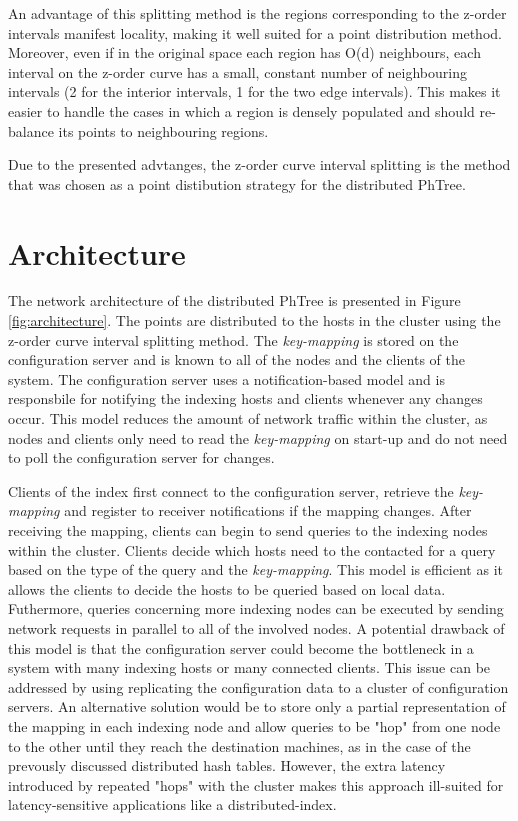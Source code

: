 \documentclass[11pt,a4paper]{globis-book}
\begin{document}
An advantage of this splitting method is the regions corresponding to the z-order intervals manifest locality, making it well suited for a point distribution method. Moreover, even if in the original space each region has O(d) neighbours, each interval on the z-order curve has a small, constant number of neighbouring intervals (2 for the interior intervals, 1 for the two edge intervals). This makes it easier to handle the cases in which a region is densely populated and should re-balance its points to neighbouring regions. 

Due to the presented advtanges, the z-order curve interval splitting is the method that was chosen as a point distibution strategy for the distributed PhTree. 
\section{Architecture}
\label{sec:distindex-architectures}

The network architecture of the distributed PhTree is presented in Figure \ref{fig:architecture}. The points are distributed to the hosts in the cluster using the z-order curve interval splitting method. The \textit{key-mapping} is stored on the configuration server and is known to all of the nodes and the clients of the system. The configuration server uses a notification-based model and is responsbile for notifying the indexing hosts and clients whenever any changes occur. This model reduces the amount of network traffic within the cluster, as nodes and clients only need to read the \textit{key-mapping} on start-up and do not need to poll the configuration server for changes. 

Clients of the index first connect to the configuration server, retrieve the \textit{key-mapping} and register to receiver notifications if the mapping changes. After receiving the mapping, clients can begin to send queries to the indexing nodes within the cluster. Clients decide which hosts need to the contacted for a query based on the type of the query and the \textit{key-mapping}. This model is efficient as it allows the clients to decide the hosts to be queried based on local data. Futhermore, queries concerning more indexing nodes can be executed by sending network requests in parallel to all of the involved nodes. A potential drawback of this model is that the configuration server could become the bottleneck in a system with many indexing hosts or many connected clients. This issue can be addressed by using replicating the configuration data to a cluster of configuration servers. An alternative solution would be to store only a partial representation of the mapping in each indexing node and allow queries to be "hop" from one node to the other until they reach the destination machines, as in the case of the prevously discussed distributed hash tables. However, the extra latency introduced by repeated "hops" with the cluster makes this approach ill-suited for latency-sensitive applications like a distributed-index.  
\end{document}
